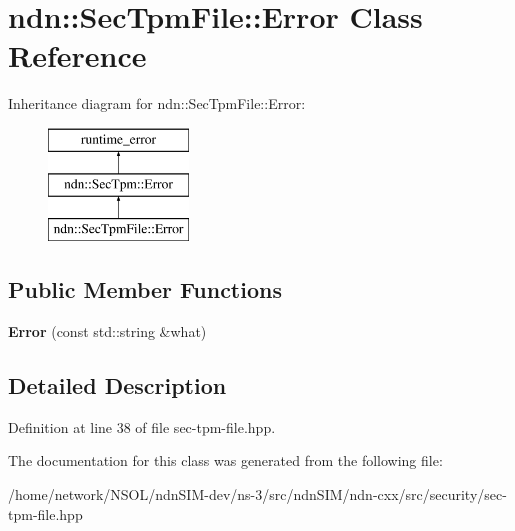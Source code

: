 \hypertarget{classndn_1_1SecTpmFile_1_1Error}{}\section{ndn\+:\+:Sec\+Tpm\+File\+:\+:Error Class Reference}
\label{classndn_1_1SecTpmFile_1_1Error}
Inheritance diagram for ndn\+:\+:Sec\+Tpm\+File\+:\+:Error\+:\begin{figure}[H]
\begin{center}
\leavevmode
\includegraphics[height=3.000000cm]{classndn_1_1SecTpmFile_1_1Error}
\end{center}
\end{figure}
\subsection*{Public Member Functions}
\begin{DoxyCompactItemize}
\item 
{\bfseries Error} (const std\+::string \&what)\hypertarget{classndn_1_1SecTpmFile_1_1Error_a846a3c797c4c6b0cab6b4e7b59127645}{}\label{classndn_1_1SecTpmFile_1_1Error_a846a3c797c4c6b0cab6b4e7b59127645}

\end{DoxyCompactItemize}


\subsection{Detailed Description}


Definition at line 38 of file sec-\/tpm-\/file.\+hpp.



The documentation for this class was generated from the following file\+:\begin{DoxyCompactItemize}
\item 
/home/network/\+N\+S\+O\+L/ndn\+S\+I\+M-\/dev/ns-\/3/src/ndn\+S\+I\+M/ndn-\/cxx/src/security/sec-\/tpm-\/file.\+hpp\end{DoxyCompactItemize}
